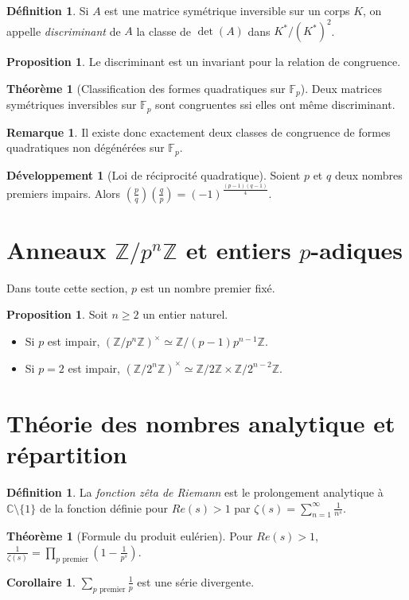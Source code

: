 \documentclass[a5paper, 10pt]{article}
\theoremstyle{definition}
\newtheorem{definition}[equation]{Définition}
\newtheorem{proposition}[equation]{Proposition}
\newtheorem{theorem}[equation]{Théorème}
\newtheorem{remark}[equation]{Remarque}
\newtheorem{corollary}[equation]{Corollaire}
\newcounter{n}
\newtheorem{dev}[n]{Développement}
\def\F{\mathbb{F}}
\def\Z{\mathbb{Z}}
\def\C{\mathbb{C}}
\begin{document}
\begin{definition}
  Si $A$ est une matrice symétrique inversible sur un corps $K$, on
  appelle \emph{discriminant} de $A$ la classe de $\det(A)$ dans
  $K^*/{(K^*)}^2$.
\end{definition}
\begin{proposition}
  Le discriminant est un invariant pour la relation de congruence.
\end{proposition}
\begin{theorem}[Classification des formes quadratiques sur $\F_p$]
  Deux matrices symétriques inversibles sur $\F_p$ sont congruentes
  ssi elles ont même discriminant.
\end{theorem}
\begin{remark}
  Il existe donc exactement deux classes de congruence de formes
  quadratiques non dégénérées sur $\F_p$.
\end{remark}

\begin{dev}[Loi de réciprocité quadratique]
  Soient $p$ et $q$ deux nombres premiers impairs. Alors
  $\displaystyle \left(\frac{p}{q}\right)\left(\frac{q}{p}\right) =
  {(-1)}^{\frac{(p-1)(q-1)}{4}}$.
\end{dev}

\section{Anneaux $\Z/p^n\Z$ et entiers $p$-adiques}

Dans toute cette section, $p$ est un nombre premier fixé.

\begin{proposition}
  Soit $n \geq 2$ un entier naturel.
  \begin{itemize}
  \item Si $p$ est impair, ${(\Z/p^n\Z)}^\times \simeq \Z/(p-1)p^{n-1}\Z$.
  \item Si $p = 2$ est impair, ${(\Z/2^n\Z)}^\times \simeq \Z/2\Z \times \Z/2^{n-2}\Z$.
  \end{itemize}
\end{proposition}

\section{Théorie des nombres analytique et répartition}

\begin{definition}
  La \emph{fonction zêta de Riemann} est le prolongement analytique à
  $\C \setminus \{1\}$ de la fonction définie pour $Re(s) > 1$ par
$\displaystyle \zeta(s) = \sum_{n=1}^\infty \frac{1}{n^s}$.
\end{definition}
\begin{theorem}[Formule du produit eulérien]
  Pour $Re(s) > 1$,
  $\displaystyle \frac{1}{\zeta(s)} = \prod_{\text{\(p\) premier}} \left(1 - \frac{1}{p^s}\right)$.
\end{theorem}
\begin{corollary}
  $\displaystyle \sum_{\text{\(p\) premier}} \frac{1}{p}$ est une série divergente.
\end{corollary}
\end{document}
